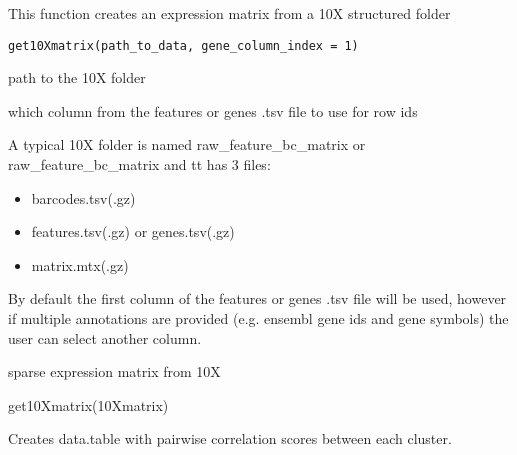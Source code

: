 \documentclass[a4paper]{book}
\begin{document}
%
\begin{Description}\relax
This function creates an expression matrix from a 10X structured folder
\end{Description}
%
\begin{Usage}
\begin{verbatim}
get10Xmatrix(path_to_data, gene_column_index = 1)
\end{verbatim}
\end{Usage}
%
\begin{Arguments}
\begin{ldescription}
\item[\code{path\_to\_data}] path to the 10X folder

\item[\code{gene\_column\_index}] which column from the features or genes .tsv file to use for row ids
\end{ldescription}
\end{Arguments}
%
\begin{Details}\relax
A typical 10X folder is named raw\_feature\_bc\_matrix or raw\_feature\_bc\_matrix and tt has 3 files:
\begin{itemize}

\item{} barcodes.tsv(.gz)
\item{} features.tsv(.gz) or genes.tsv(.gz)
\item{} matrix.mtx(.gz)

\end{itemize}

By default the first column of the features or genes .tsv file will be used, however if multiple
annotations are provided (e.g. ensembl gene ids and gene symbols) the user can select another column.
\end{Details}
%
\begin{Value}
sparse expression matrix from 10X
\end{Value}
%
\begin{Examples}
\begin{ExampleCode}
    get10Xmatrix(10Xmatrix)
\end{ExampleCode}
\end{Examples}
%
\begin{Description}\relax
Creates data.table with pairwise correlation scores between each cluster.
\end{Description}
\end{document}
